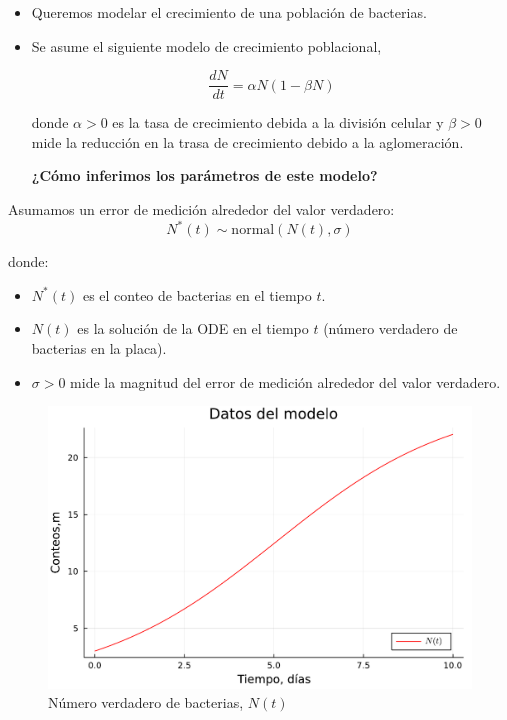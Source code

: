 \documentclass[11pt]{beamer}
\begin{document}
\begin{frame}
	\begin{itemize}
		\item Queremos modelar el crecimiento de una población de bacterias.
		\item Se asume el siguiente modelo de crecimiento poblacional,
		
		\[\dfrac{dN}{dt} = \alpha N (1-\beta N)\]
		
		donde $\alpha > 0$ es la tasa de crecimiento debida a la división celular y $\beta >0$ mide la reducción en la trasa de crecimiento debido a la aglomeración.
		
		\begin{center}
			\textbf{¿Cómo inferimos los parámetros de este modelo?}
		\end{center}
	\end{itemize}
\end{frame}

\begin{frame}
	Asumamos un error de medición alrededor del valor verdadero:
	\[N^*(t) \sim \text{normal}(N(t),\sigma)\]	
	
	donde:
		\begin{itemize}
			\item $N^*(t)$ es el conteo de bacterias en el tiempo $t$.
			\item $N(t)$ es la solución de la ODE en el tiempo $t$ (número verdadero de bacterias en la placa).
			\item $\sigma >0$ mide la magnitud del error de medición alrededor del valor verdadero.
		\end{itemize}
\end{frame}

\begin{frame}
	\begin{figure}
		\includegraphics[scale=0.5]{images/bacterias_modelo.pdf}
		\caption{Número verdadero de bacterias, $N(t)$}
	\end{figure}
\end{frame}
\end{document}
